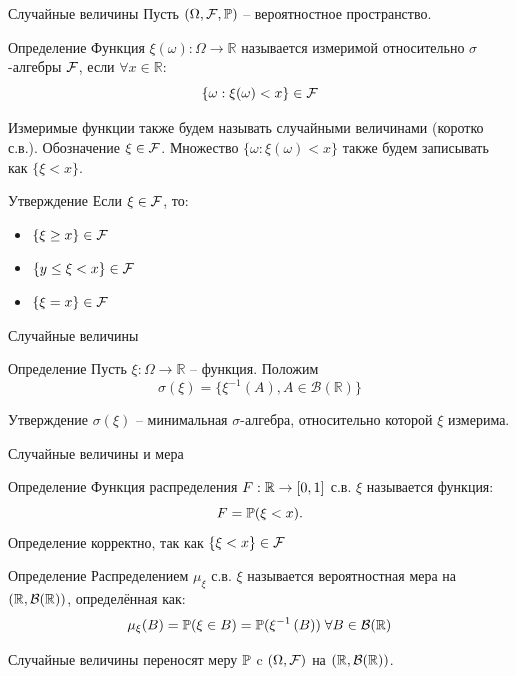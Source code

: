 \documentclass{beamer}
\begin{document}
\begin{frame}{Случайные величины}
    Пусть $(\Omega, \mathcal{\mathcal{F}}, \mathbb{P})$ -- вероятностное пространство. 
    \begin{block}{Определение}
        Функция $\xi(\omega): \Omega \to \mathbb{R}$ называется измеримой относительно $\sigma$-алгебры ${\mathcal{F}}$, если $\forall x \in \mathbb{R}$:
        $$
            \{\omega : \xi(\omega) < x \} \in {\mathcal{F}}
        $$
    \end{block}
    Измеримые функции также будем называть случайными величинами (коротко с.в.). Обозначение $\xi \in \mathcal{\mathcal{F}}$.
    Множество $\{\omega : \xi(\omega) < x \}$ также будем записывать как $\{ \xi < x\}$.

    \begin{block}{Утверждение}
    Если $\xi \in \mathcal{\mathcal{F}}$, то:
        \begin{itemize}
            \item $\{\xi \geq x \} \in {\mathcal{F}}$
            \item $\{y \leq \xi < x \} \in {\mathcal{F}}$
            \item $\{\xi = x \} \in {\mathcal{F}}$
        \end{itemize}
    \end{block}
\end{frame}

\begin{frame}{Случайные величины}
    \begin{block}{Определение}
        Пусть $\xi : \Omega\to\mathbb{R}$ -- функция.
        Положим 
        $$\sigma(\xi) = \{ \xi^{-1}(A), A\in \mathcal{B}(\mathbb{R})\}$$
    \end{block}
    \begin{block}{Утверждение}
         $\sigma(\xi)$ -- минимальная $\sigma$-алгебра, относительно которой $\xi$ измерима.
    \end{block}
\end{frame}

\begin{frame}{Случайные величины и мера}
    \begin{block}{Определение}
        Функция распределения $F: \mathbb{R}\to[0, 1]$ с.в. $\xi$ называется функция:
        $$
            F = \mathbb{P}(\xi < x).
        $$Определение корректно, так как $\{\xi < x\} \in \mathcal{F}$
    \end{block}
    \begin{block}{Определение}
        Распределением $\mu_{\xi}$ с.в. $\xi$ называется вероятностная мера на $\left(\mathbb{R}, \mathcal{B}(\mathbb{R})\right)$, определённая как:
        $$
            \mu_{\xi}(B) = \mathbb{P}(\xi \in B) = \mathbb{P}(\xi^{-1}\left( B \right))\;\forall B\in\mathcal{B}(\mathbb{R})
        $$
    \end{block}
    Случайные величины переносят меру $\mathbb{P}$ c $(\Omega, \mathcal{F})$ на $(\mathbb{R}, \mathcal{B}(\mathbb{R}))$. 
\end{frame}
\end{document}
